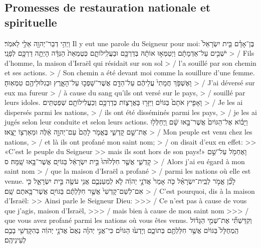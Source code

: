 \begin{paracol}[1]
  \subsection*{Promesses de restauration nationale et spirituelle}
  \verset
  {וַיְהִ֥י דְבַר־יְהוָ֖ה אֵלַ֥י לֵאמֹֽר׃}
  {Il y eut une parole du Seigneur pour moi:}
  \verset
  {בֶּן־אָדָ֗ם בֵּ֤ית יִשְׂרָאֵל֙ יֹשְׁבִ֣ים עַל־אַדְמָתָ֔ם
    וַיְטַמְּא֣וּ אוֹתָ֔הּ בְּדַרְכָּ֖ם וּבַעֲלִֽילוֹתָ֑ם
    כְּטֻמְאַת֙ הַנִּדָּ֔ה הָיְתָ֥ה דַרְכָּ֖ם לְפָנָֽי׃}
  {> / Fils d’homme, la maison d’Israël qui résidait sur son sol
    > / l’a souillé par son chemin et ses actions.
    > / Son chemin a été devant moi comme la souillure d’une femme.}
  \verset
  {וָאֶשְׁפֹּ֤ךְ חֲמָתִי֙ עֲלֵיהֶ֔ם
    עַל־הַדָּ֖ם אֲשֶׁר־שָׁפְכ֣וּ עַל־הָאָ֑רֶץ
    וּבְגִלּוּלֵיהֶ֖ם טִמְּאֽוּהָ׃}
  {> / J’ai déversé sur eux ma fureur
    > / à cause du sang qu’ils ont versé sur le pays,
    > / souillé par leurs idoles.}
  \verset
  {וָאָפִ֤יץ אֹתָם֙ בַּגּוֹיִ֔ם
    וַיִּזָּר֖וּ בָּאֲרָצ֑וֹת
    כְּדַרְכָּ֥ם וְכַעֲלִילוֹתָ֖ם שְׁפַטְתִּֽים׃}
  {> / Je les ai dispersés parmi les nations,
    > / ils ont été disséminés parmi les pays,
    > / je les ai jugés selon leur conduite et selon leurs actions.}
  \verset
  {וַיָּב֗וֹא אֶל־הַגּוֹיִם֙ אֲשֶׁר־בָּ֣אוּ שָׁ֔ם
    וַֽיְחַלְּל֖וּ אֶת־שֵׁ֣ם קָדְשִׁ֑י
    בֶּאֱמֹ֤ר לָהֶם֙
    עַם־יְהוָ֣ה אֵ֔לֶּה
    וּמֵאַרְצ֖וֹ יָצָֽאוּ׃}
  {> / Mon peuple est venu chez les nations,
    > / et là ils ont profané mon saint nom;
    > / on disait d’eux en effet:
    >> «C’est le peuple du Seigneur
    >> mais ils sont hors de son pays!»}
  \verset
  {וָאֶחְמֹ֖ל עַל־שֵׁ֣ם קָדְשִׁ֑י
    אֲשֶׁ֤ר חִלְּל֙וּהוּ֙ בֵּ֣ית יִשְׂרָאֵ֔ל
    בַּגּוֹיִ֖ם אֲשֶׁר־בָּ֥אוּ שָֽׁמָּה׃ ס}
  {> / Alors j’ai eu égard à mon saint nom
    > / que la maison d’Israël a profané
    > / parmi les nations où elle est venue.}
  \parSpace
  \verset
  {לָכֵ֞ן אֱמֹ֣ר לְבֵֽית־יִשְׂרָאֵ֗ל
    כֹּ֤ה אָמַר֙ אֲדֹנָ֣י יְהוִ֔ה
    לֹ֧א לְמַעַנְכֶ֛ם אֲנִ֥י עֹשֶׂ֖ה בֵּ֣ית יִשְׂרָאֵ֑ל
    כִּ֤י אִם־לְשֵׁם־קָדְשִׁי֙
    אֲשֶׁ֣ר חִלַּלְתֶּ֔ם בַּגּוֹיִ֖ם אֲשֶׁר־בָּ֥אתֶם שָֽׁם׃}
  {> / C’est pourquoi, dis à la maison d’Israël:
    >> Ainsi parle le Seigneur Dieu:
    >>> / Ce n’est pas à cause de vous que j’agis, maison d’Israël,
    >>> / mais bien à cause de mon saint nom
    >>> / que vous avez profané parmi les nations où vous êtes venus.}
  \verset
  {וְקִדַּשְׁתִּ֞י אֶת־שְׁמִ֣י הַגָּד֗וֹל
    הַֽמְחֻלָּל֙ בַּגּוֹיִ֔ם
    אֲשֶׁ֥ר חִלַּלְתֶּ֖ם בְּתוֹכָ֑ם
    וְיָדְע֙וּ הַגּוֹיִ֜ם כִּי־אֲנִ֣י יְהוָ֗ה
    נְאֻם֙ אֲדֹנָ֣י יְהוִ֔ה
    בְּהִקָּדְשִׁ֥י בָכֶ֖ם לְעֵינֵיהֶֽם׃}

\end{paracol}
